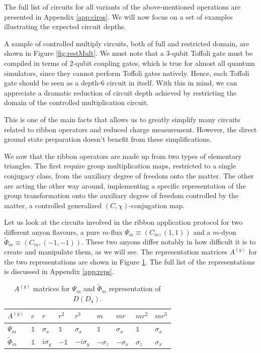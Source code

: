 \documentclass[two column]{article}
\begin{document}
The full list of circuits for all variants of the above-mentioned operations are presented in Appendix \ref{app:cirqs}.
We will now focus on a set of examples illustrating the expected circuit depths.

A sample of controlled multiply circuits, both of full and restricted domain, are shown in Figure \ref{fig:restMult}. We must note that a 3-qubit Toffoli gate must be compiled in terms of 2-qubit coupling gates, which is true for almost all quantum simulators, since they cannot perform Toffoli gates natively. Hence, each Toffoli gate should be seen as a depth-6 circuit in itself. With this in mind, we can appreciate a dramatic reduction of circuit depth achieved by restricting the domain of the controlled multiplication circuit.

This is one of the main facts that allows us to greatly simplify many circuits related to ribbon operators and reduced charge measurement. However, the direct ground state preparation doesn't benefit from these simplifications.

We saw that the ribbon operators are made up from two types of elementary triangles. The first require group multiplication maps, restricted to a single conjugacy class, from the auxiliary degree of freedom onto the matter. The other are acting the other way around, implementing a specific representation of the group transformation onto the auxiliary degree of freedom controlled by the matter, a controlled generalized $(C, \chi)$-conjugation map.

Let us look at the circuits involved in the ribbon application protocol for two different anyon flavours, a pure $m$-flux $\Psi_m \equiv (C_m, (1,1))$ and a $m$-dyon $\tilde{\Phi}_m \equiv (C_m, (-1, -1))$. These two anyons differ notably in how difficult it is to create and manipulate them, as we will see. The representation matrices $A^{(g)}$ for the two representations are shown in Figure \ref{tab:somereps}. The full list of the representations is discussed in Appendix \ref{app:reps}.

\begin{table}[]
    \centering
    \begin{tabular}{|p{0.5cm}||p{0.25cm}|p{0.5cm}|p{0.5cm}|p{0.6cm}|p{0.5cm}|p{0.5cm}|p{0.5cm}|p{0.5cm}|}
    \hline
  $A^{(g)}$ & $e$ &   $r$ & $r^2$ & $r^3$ &  $m$ & $mr$ & $mr^2$ & $mr^3$ \\
\hline\hline
 $\Psi_{m}$ &$\mathbb{1}$&  $\sigma_x$ & $\mathbb{1}$&  $\sigma_x$ & $\mathbb{1}$& $\sigma_x$ &  $\mathbb{1}$&   $\sigma_x$ \\\hline
 $\tilde{\Phi}_{m}$ &$\mathbb{1}$&$i\sigma_y$ &$-\mathbb{1}$& $-i\sigma_y$ &$-\sigma_z$ &$-\sigma_x$ &  $\sigma_z$ &   $\sigma_x$ \\\hline
\end{tabular}
    \caption{$A^{(g)}$ matrices for $\Psi_m$ and $\tilde{\Phi}_m$ representation of $D(D_4)$.}
    \label{tab:somereps}
\end{table}
\end{document}
